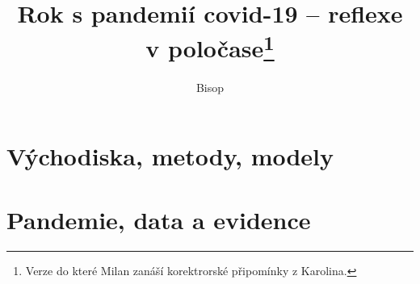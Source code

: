 \documentclass{book}
\begin{document}
%
%


\title{Rok s pandemií covid-19 -- reflexe v poločase\footnote{Verze do které Milan zanáší korektrorské připomínky z Karolina.}}
\author{Bisop}
\maketitle


%
\setcounter{page}{5}



\part{Východiska, metody, modely}


\newpage \thispagestyle{empty} \mbox{} \newpage

\newpage \thispagestyle{empty} \mbox{} \newpage




\part{Pandemie, data a evidence}


\newpage \thispagestyle{empty} \mbox{} \newpage



\newpage \thispagestyle{empty} \mbox{} \newpage

\newpage \thispagestyle{empty} \mbox{} \newpage

\newpage \thispagestyle{empty} \mbox{} \newpage

\end{document}
